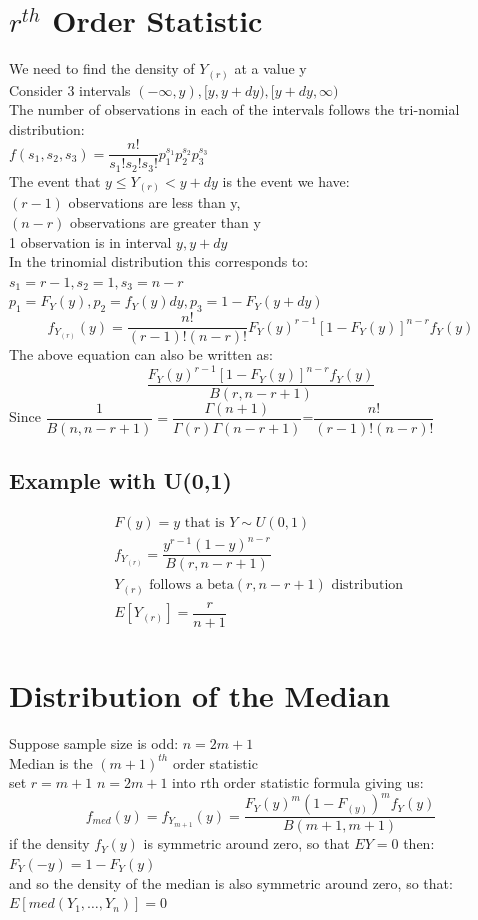 \documentclass[openany]{book}
\begin{document}
\begin{flushleft}
\section{$r^{th}$ Order Statistic}
We need to find the density of $Y_{(r)}$ at a value y\\
Consider 3 intervals $(-\infty,y),[y,y+dy),[y+dy,\infty)$\\
The number of observations in each of the intervals follows the tri-nomial distribution:\\
$f(s_1,s_2,s_3)=\dfrac{n!}{s_1!s_2!s_3!}p_1^{s_1}p_2^{s_2}p_3^{s_3}$\\
The event that $y\leq Y_{(r)}<y+dy$ is the event we have:\\
$(r-1)$ observations are less than y,\\
$(n-r)$ observations are greater than y\\
1 observation is in interval $y,y+dy$\\
In the trinomial distribution this corresponds to:\\
$s_1=r-1,s_2=1,s_3=n-r$\\
$p_1=F_Y(y), p_2=f_Y(y)dy, p_3=1-F_Y(y+dy)$\\
\[f_{Y_{(r)}}(y)=\dfrac{n!}{(r-1)!(n-r)!}F_Y(y)^{r-1}[1-F_Y(y)]^{n-r}f_Y(y)
\]
The above equation can also be written as:\\
\[\dfrac{F_Y(y)^{r-1}[1-F_Y(y)]^{n-r}f_Y(y)}{B(r,n-r+1)}
\]
Since $\dfrac{1}{B(n,n-r+1)}=\dfrac{\Gamma(n+1)}{\Gamma(r)\Gamma(n-r+1)}$=$\dfrac{n!}{(r-1)!(n-r)!}$
\subsection{Example with U(0,1)}
\begin{multline*}
F(y)=y \text{ that is } Y\sim U(0,1)\\
f_{Y_{(r)}}=\dfrac{y^{r-1}(1-y)^{n-r}}{B(r,n-r+1)}\\
Y_{(r)} \text{ follows a beta}(r,n-r+1)\text{ distribution }\\
E[Y_{(r)}]=\dfrac{r}{n+1}\\
\end{multline*}
\section{Distribution of the Median}
Suppose sample size is odd: $n=2m+1$\\
Median is the $(m+1)^{th}$ order statistic\\
set $r=m+1$ \quad $n=2m+1$ into rth order statistic formula giving us:
\[f_{med}(y)=f_{Y_{m+1}}(y)=\dfrac{F_Y(y)^m(1-F_(y))^mf_Y(y)}{B(m+1,m+1)}
\]
if the density $f_Y(y)$ is symmetric around zero, so that $EY=0$ then:\\
$F_Y(-y)=1-F_Y(y)$\\
and so the density of the median is also symmetric around zero, so that:\\
$E[med(Y_1,\dots,Y_n)]=0$ 

\end{flushleft}
\end{document}
